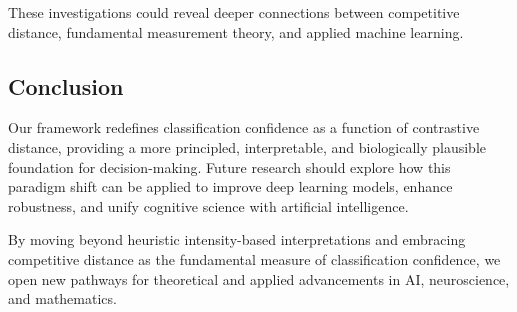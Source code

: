 These investigations could reveal deeper connections between competitive distance, fundamental measurement theory, and applied machine learning.

\subsection{Conclusion}

Our framework redefines classification confidence as a function of contrastive distance, providing a more principled, interpretable, and biologically plausible foundation for decision-making. Future research should explore how this paradigm shift can be applied to improve deep learning models, enhance robustness, and unify cognitive science with artificial intelligence.

By moving beyond heuristic intensity-based interpretations and embracing competitive distance as the fundamental measure of classification confidence, we open new pathways for theoretical and applied advancements in AI, neuroscience, and mathematics.
